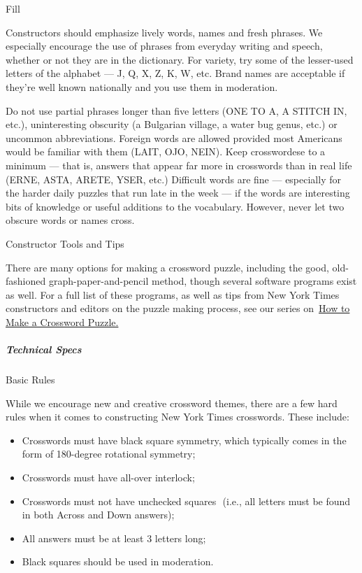 Fill

Constructors should emphasize lively words, names and fresh phrases. We
especially encourage the use of phrases from everyday writing and
speech, whether or not they are in the dictionary. For variety, try some
of the lesser-used letters of the alphabet --- J, Q, X, Z, K, W, etc.
Brand names are acceptable if they're well known nationally and you use
them in moderation.

Do not use partial phrases longer than five letters (ONE TO A, A STITCH
IN, etc.), uninteresting obscurity (a Bulgarian village, a water bug
genus, etc.) or uncommon abbreviations. Foreign words are allowed
provided most Americans would be familiar with them (LAIT, OJO, NEIN).
Keep crosswordese to a minimum --- that is, answers that appear far more
in crosswords than in real life (ERNE, ASTA, ARETE, YSER, etc.)
Difficult words are fine --- especially for the harder daily puzzles
that run late in the week --- if the words are interesting bits of
knowledge or useful additions to the vocabulary. However, never let two
obscure words or names cross.

Constructor Tools and Tips

There are many options for making a crossword puzzle, including the
good, old-fashioned graph-paper-and-pencil method, though several
software programs exist as well. For a full list of these programs, as
well as tips from New York Times constructors and editors on the puzzle
making process, see our series
on~\href{https://www.nytimes3xbfgragh.onion/2018/09/14/crosswords/how-to-make-a-crossword-puzzle-the-series.html}{How
to Make a Crossword Puzzle.}

\hypertarget{technical-specs}{%
\subparagraph{Technical Specs}\label{technical-specs}}

Basic Rules

While we encourage new and creative crossword themes, there are a few
hard rules when it comes to constructing New York Times crosswords.
These include:

\begin{itemize}
\tightlist
\item
  Crosswords must have black square symmetry, which typically comes in
  the form of 180-degree rotational symmetry;
\item
  Crosswords must have all-over interlock;
\item
  Crosswords must not have unchecked squares  (i.e., all letters must be
  found in both Across and Down answers);
\item
  All answers must be at least 3 letters long;
\item
  Black squares should be used in moderation.
\end{itemize}

